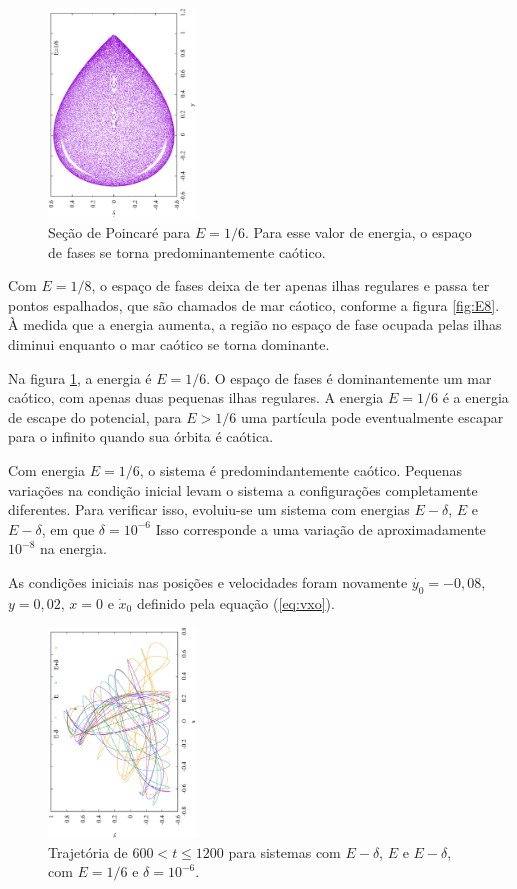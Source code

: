 \documentclass[brazilian, 10pt, a4paper, final]{article}
\begin{document}
\begin{multicols*}{2}
\begin{figure}[H]
  \centering
  \includegraphics[width=0.35\textwidth,angle=-90]{P016667.eps}
  \caption{Seção de Poincaré para $E=1/6$. Para esse valor de energia, o espaço de fases se torna predominantemente caótico.}
  \label{fig:E6}
\end{figure}

Com $E=1/8$, o espaço de fases deixa de ter apenas ilhas regulares e passa ter pontos espalhados, que são chamados de mar cáotico, conforme a figura \ref{fig:E8}. À medida que a energia aumenta, a região no espaço de fase ocupada pelas ilhas diminui enquanto o mar caótico se torna dominante.

Na figura \ref{fig:E6}, a energia é $E=1/6$. O espaço de fases é dominantemente um mar caótico, com apenas duas pequenas ilhas regulares. A energia $E=1/6$ é a energia de escape do potencial, para $E>1/6$ uma partícula pode eventualmente escapar para o infinito quando sua órbita é caótica.

Com energia $E=1/6$, o sistema é predomindantemente caótico. Pequenas variações na condição inicial levam o sistema a configurações completamente diferentes. Para verificar isso, evoluiu-se um sistema com energias $E-\delta$, $E$ e $E-\delta$, em que $\delta=10^{-6}$ Isso corresponde a uma variação de aproximadamente $10^{-8}$ na energia.

As condições iniciais nas posições e velocidades foram novamente $\dot{y_0}=-0,08$, $y=0,02$, $x=0$ e $\dot{x}_0$ definido pela equação (\ref{eq:vxo}).

\begin{figure}[H]
  \centering
  \includegraphics[width=0.35\textwidth,angle=-90]{Henon-Heiles_caos.eps}
  \caption{Trajetória de $600 < t \le 1200$ para sistemas com $E-\delta$, $E$ e $E-\delta$, com $E=1/6$ e $\delta=10^{-6}$.}
  \label{fig:caos}
\end{figure}


\end{multicols*}
\end{document}

